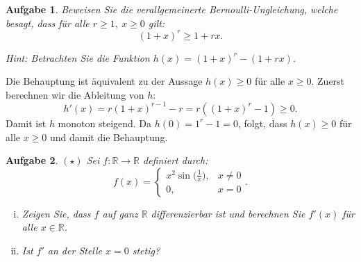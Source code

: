 \documentclass[a4paper, 20]{exam}
\newtheorem{ex}{Aufgabe}
\newcommand\RR{\mathbb{R}}
\begin{document}
\begin{ex}
Beweisen Sie die verallgemeinerte Bernoulli-Ungleichung, welche besagt, dass f\"ur alle $r\geq 1, \ x\geq 0$ gilt:
$$ (1+x)^r\geq 1+rx .$$

Hint: Betrachten Sie die Funktion $h(x)=(1+x)^r - (1+rx).$
\end{ex}
\begin{solution}
Die Behauptung ist \"aquivalent zu der Aussage $h(x)\geq 0$ f\"ur alle $x\geq 0$. Zuerst berechnen wir die Ableitung von $h$:
$$h'(x) = r(1+x)^{r-1} - r = r((1+x)^r -1)\geq 0.$$
Damit ist $h$ monoton steigend. Da $h(0)= 1^r -1=0$, folgt, dass $h(x)\geq 0$ f\"ur alle $x\geq 0$ und damit die Behauptung.
\end{solution}


\begin{ex}{$(\star)$}
Sei $f:\RR \longrightarrow \RR$ definiert durch:
$$ f(x)= \left\{\begin{array}{lr}  x^2 \sin\big( \frac{1}{x} \big), & x\neq 0 \\
0,  & x=0 \end{array}\right. .$$
\begin{enumerate}[i.)]
\item
Zeigen Sie, dass $f$ auf ganz $\RR$ differenzierbar ist und berechnen Sie $f'(x)$ f\"ur alle $x\in \RR$.
\item
Ist $f'$ an der Stelle $x=0$ stetig?
\end{enumerate}
\end{ex}
\end{document}
